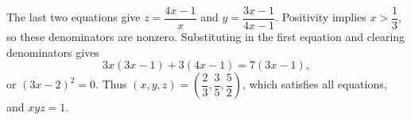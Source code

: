 The last two equations give $z=\dfrac{4x-1}{x}$ and $y=\dfrac{3x-1}{4x-1}$. Positivity implies $x>\dfrac{1}{3}$, so these denominators are nonzero. Substituting in the first equation and clearing denominators gives
\[
3x(3x-1)+3(4x-1)=7(3x-1),
\]
or $(3x-2)^2=0$. Thus $(x,y,z)=\left(\dfrac{2}{3},\dfrac{3}{5},\dfrac{5}{2}\right)$, which satisfies all equations, and $\boxed{xyz=1}$.
